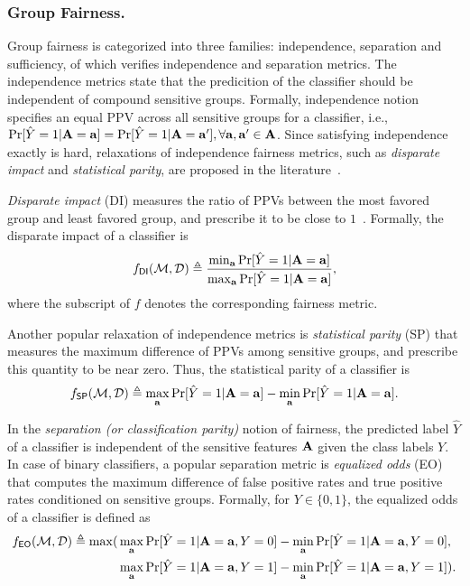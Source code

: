 \subsubsection{Group Fairness.} Group fairness is categorized into three families: independence, separation and sufficiency, of which {\justicia} verifies independence and separation metrics. 
The independence metrics state that the predicition of the classifier should be independent of compound sensitive groups. Formally, independence notion specifies an equal PPV across all sensitive groups for a classifier, i.e., $\Pr[\hat{Y} =1 | \mathbf{A} =  \mathbf{a}]  =  \Pr[\hat{Y} =1 | \mathbf{A} =  \mathbf{a}'] , \forall \mathbf{a}, \mathbf{a}' \in \mathbf{A}$.
Since satisfying independence exactly is hard, relaxations of independence fairness metrics, such as \textit{disparate impact} and \textit{statistical parity}, are proposed in the literature~\cite{dwork2012fairness,feldman2015certifying}.

\textit{Disparate impact} (DI) measures the ratio of PPVs between the most favored group and least favored group, and prescribe it to be close to $1$~\cite{feldman2015certifying}.  Formally, the disparate impact of a classifier is 
\[
f_{\mathsf{DI}}(\mathcal{M}, \mathcal{D}) \triangleq \frac{\min_{\mathbf{a}} \Pr[\hat{Y} =1 | \mathbf{A} =  \mathbf{a}]}{\max_{\mathbf{a}} \Pr[\hat{Y} =1 | \mathbf{A} =  \mathbf{a}]},
\]
where the subscript of $ f $ denotes the corresponding fairness metric.

Another popular relaxation of independence metrics  is \textit{statistical parity} (SP) that measures the maximum difference of PPVs among sensitive groups, and prescribe this quantity to be near zero. Thus, the statistical parity of  a classifier is 
\[ f_{\mathsf{SP}}(\mathcal{M}, \mathcal{D}) \triangleq \max_{\mathbf{a}}\Pr[\hat{Y} =1 | \mathbf{A} = \mathbf{a}] - \min_{\mathbf{a}}\Pr[\hat{Y} =1 | \mathbf{A} = \mathbf{a}]. \]



In the \textit{separation (or classification parity)} notion of fairness, the predicted label $\hat{Y}$ of a classifier is independent of the sensitive features $\mathbf{A}$ given the class labels $Y$. In case of binary classifiers, a popular separation metric is \textit{equalized odds} (EO)~\cite{hardt2016equality} that computes the maximum difference of false positive rates  and true positive rates  conditioned on sensitive groups. Formally,  for $ Y \in \{0,1\} $,  the equalized odds of a classifier is defined as 
\begin{align*}
f_{\mathsf{EO}}(\mathcal{M}, \mathcal{D})  \triangleq \max(&\max_{\mathbf{a}}\Pr[\hat{Y} =1 | \mathbf{A} = \mathbf{a}, Y = 0] - \min_{\mathbf{a}}\Pr[\hat{Y} =1 | \mathbf{A} = \mathbf{a}, Y = 0], \\
&\max_{\mathbf{a}}\Pr[\hat{Y} =1 | \mathbf{A} = \mathbf{a}, Y = 1] - \min_{\mathbf{a}}\Pr[\hat{Y} =1 | \mathbf{A} = \mathbf{a}, Y = 1]). 
\end{align*}


